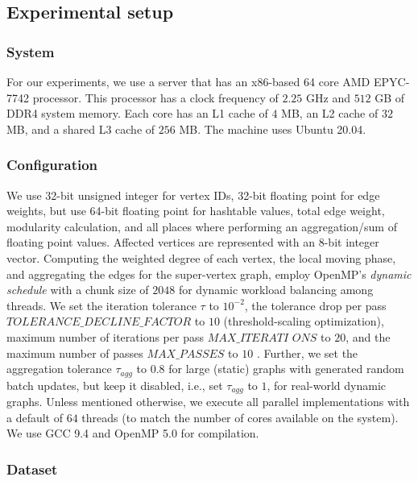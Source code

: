 \subsection{Experimental setup}
\label{sec:setup}

\subsubsection{System}
\label{sec:system}

For our experiments, we use a server that has an x86-based 64 core AMD EPYC-7742 processor. This processor has a clock frequency of $2.25$ GHz and $512$ GB of DDR4 system memory. Each core has an L1 cache of $4$ MB, an L2 cache of $32$ MB, and a shared L3 cache of $256$ MB. The machine uses Ubuntu 20.04.


\subsubsection{Configuration}
\label{sec:configuration}

We use 32-bit unsigned integer for vertex IDs, 32-bit floating point for edge weights, but use 64-bit floating point for hashtable values, total edge weight, modularity calculation, and all places where performing an aggregation/sum of floating point values. Affected vertices are represented with an 8-bit integer vector. Computing the weighted degree of each vertex, the local moving phase, and aggregating the edges for the super-vertex graph, employ OpenMP's \textit{dynamic schedule} with a chunk size of $2048$ for dynamic workload balancing among threads. We set the iteration tolerance $\tau$ to $10^{-2}$, the tolerance drop per pass $TOLERANCE\_DECLINE\_FACTOR$ to $10$ (threshold-scaling optimization), maximum number of iterations per pass $MAX\_ITERATI$ $ONS$ to $20$, and the maximum number of passes $MAX\_PASSES$ to $10$ \cite{sahu2023gvelouvain}. Further, we set the aggregation tolerance $\tau_{agg}$ to $0.8$ for large (static) graphs with generated random batch updates, but keep it disabled, i.e., set $\tau_{agg}$ to $1$, for real-world dynamic graphs. Unless mentioned otherwise, we execute all parallel implementations with a default of $64$ threads (to match the number of cores available on the system). We use GCC 9.4 and OpenMP 5.0 \cite{openmp18} for compilation.


\subsubsection{Dataset}
\label{sec:dataset}

